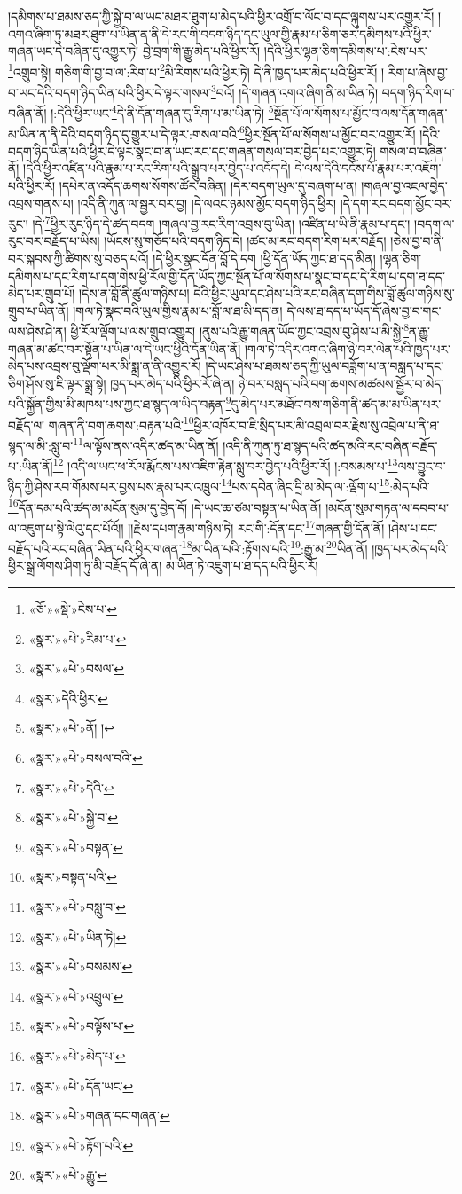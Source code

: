 །དམིགས་པ་ཐམས་ཅད་ཀྱི་སྐྱེ་བ་ལ་ཡང་མཐར་ཐུག་པ་མེད་པའི་ཕྱིར་འགྲོ་བ་ལོང་བ་དང་ལྐུགས་པར་འགྱུར་རོ། །འགའ་ཞིག་ཏུ་མཐར་ཐུག་པ་ཡིན་ན་ནི་དེ་རང་གི་བདག་ཉིད་དང་ཡུལ་གྱི་རྣམ་པ་ཅིག་ཅར་དམིགས་པའི་ཕྱིར་གཞན་ཡང་དེ་བཞིན་དུ་འགྱུར་ཏེ། བྱེ་བྲག་གི་རྒྱུ་མེད་པའི་ཕྱིར་རོ། །དེའི་ཕྱིར་ལྷན་ཅིག་དམིགས་པ་:ངེས་པར་\footnote{«ཅོ་»«སྡེ་»ངེས་པ་}འགྲུབ་སྟེ། གཅིག་གི་བྱ་བ་ལ་:རིག་པ་\footnote{«སྣར་»«པེ་»རིམ་པ་}མི་རིགས་པའི་ཕྱིར་ཏེ། དེ་ནི་ཁྱད་པར་མེད་པའི་ཕྱིར་རོ། །
རིག་པ་ཞེས་བྱ་བ་ཡང་དེའི་བདག་ཉིད་ཡིན་པའི་ཕྱིར་དེ་ལྟར་གསལ་\footnote{«སྣར་»«པེ་»བསལ་}བའོ། །དེ་གཞན་འགའ་ཞིག་ནི་མ་ཡིན་ཏེ། བདག་ཉིད་རིག་པ་བཞིན་ནོ། །:དེའི་ཕྱིར་ཡང་\footnote{«སྣར་»དེའི་ཕྱིར་}དེ་ནི་དོན་གཞན་དུ་རིག་པ་མ་ཡིན་ཏེ། \footnote{«སྣར་»«པེ་»ནོ། ། }སྔོན་པོ་ལ་སོགས་པ་མྱོང་བ་ལས་དོན་གཞན་མ་ཡིན་ན་ནི་དེའི་བདག་ཉིད་དུ་གྱུར་པ་དེ་ལྟར་:གསལ་བའི་\footnote{«སྣར་»«པེ་»བསལ་བའི་}ཕྱིར་སྔོན་པོ་ལ་སོགས་པ་མྱོང་བར་འགྱུར་རོ། །དེའི་བདག་ཉིད་ཡིན་པའི་ཕྱིར་དེ་ལྟར་སྣང་བ་ན་ཡང་རང་དང་གཞན་གསལ་བར་བྱེད་པར་འགྱུར་ཏེ། གསལ་བ་བཞིན་ནོ། །དེའི་ཕྱིར་འཛིན་པའི་རྣམ་པ་རང་རིག་པའི་སྒྲུབ་པར་བྱེད་པ་འདོད་དེ། དེ་ལས་དེའི་དངོས་པོ་རྣམ་པར་འཇོག་པའི་ཕྱིར་རོ། །དཔེར་ན་འདོད་ཆགས་སོགས་ཚོར་བཞིན། །དེར་བདག་ཡུལ་དུ་བཞག་པ་ན། །གཞལ་བྱ་འཇལ་བྱེད་འབྲས་གནས་པ། །འདི་ནི་ཀུན་ལ་སྦྱར་བར་བྱ། །དེ་ལའང་ཉམས་མྱོང་བདག་ཉིད་ཕྱིར། །དེ་དག་རང་བདག་མྱོང་བར་རུང་། །དེ་\footnote{«སྣར་»«པེ་»དེའི་}ཕྱིར་རུང་ཉིད་དེ་ཚད་བདག །གཞལ་བྱ་རང་རིག་འབྲས་བུ་ཡིན། །འཛིན་པ་ཡི་ནི་རྣམ་པ་དང་། །བདག་ལ་རུང་བར་བརྗོད་པ་ཡིས། །ཡོངས་སུ་གཅོད་པའི་བདག་ཉིད་དེ། །ཚང་མ་རང་བདག་རིག་པར་བརྗོད། །ཅེས་བྱ་བ་ནི་བར་སྐབས་ཀྱི་ཚིགས་སུ་བཅད་པའོ། །དེ་ཕྱིར་སྣང་དོན་བློ་དེ་དག །ཕྱི་དོན་ཡོད་ཀྱང་ཐ་དད་མིན། །ལྷན་ཅིག་དམིགས་པ་དང་རིག་པ་དག་གིས་ཕྱི་རོལ་གྱི་དོན་ཡོད་ཀྱང་སྔོན་པོ་ལ་སོགས་པ་སྣང་བ་དང་དེ་རིག་པ་དག་ཐ་དད་མེད་པར་གྲུབ་པོ། །དེས་ན་བློ་ནི་ཚུལ་གཉིས་པ། དེའི་ཕྱིར་ཡུལ་དང་ཤེས་པའི་རང་བཞིན་དག་གིས་བློ་ཚུལ་གཉིས་སུ་གྲུབ་པ་ཡིན་ནོ། །གལ་ཏེ་སྣང་བའི་ཡུལ་གྱིས་རྣམ་པ་བློ་ལ་ཐ་མི་དད་ན། དེ་ལས་ཐ་དད་པ་ཡོད་དོ་ཞེས་བྱ་བ་གང་ལས་ཤེས་ཤེ་ན། ཕྱི་རོལ་ལྡོག་པ་ལས་གྲུབ་འགྱུར། །ནུས་པའི་རྒྱུ་གཞན་ཡོད་ཀྱང་འབྲས་བུ་ཤེས་པ་མི་སྐྱེ་\footnote{«སྣར་»«པེ་»སྐྱེ་བ་}ན་རྒྱུ་གཞན་མ་ཚང་བར་སྟོན་པ་ཡིན་ལ་དེ་ཡང་ཕྱིའི་དོན་ཡིན་ནོ། །གལ་ཏེ་འདིར་འགའ་ཞིག་ཉེ་བར་ལེན་པའི་ཁྱད་པར་མེད་པས་འབྲས་བུ་ལྡོག་པར་མི་སྨྲ་ན་ནི་འགྱུར་རོ། །དེ་ཡང་ཤེས་པ་ཐམས་ཅད་ཀྱི་ཡུལ་བཟློག་པ་ན་བསླད་པ་དང་ཅིག་ཤོས་སུ་ཇི་ལྟར་སྨྲ་སྟེ། ཁྱད་པར་མེད་པའི་ཕྱིར་རོ་ཞེ་ན། ཉེ་བར་བསླད་པའི་བག་ཆགས་མཚམས་སྦྱོར་བ་མེད་པའི་སྐྱོན་གྱིས་མི་མཁས་པས་ཀྱང་ཐ་སྙད་ལ་ཡིད་བརྟན་\footnote{«སྣར་»«པེ་»བསྟན་}དུ་མེད་པར་མཐོང་བས་གཅིག་ནི་ཚད་མ་མ་ཡིན་པར་བརྗོད་ལ། གཞན་ནི་བག་ཆགས་:བརྟན་པའི་\footnote{«སྣར་»བསྟན་པའི་}ཕྱིར་འཁོར་བ་ཇི་སྲིད་པར་མི་འབྲལ་བར་རྗེས་སུ་འབྲེལ་པ་ནི་ཐ་སྙད་ལ་མི་:སླུ་བ་\footnote{«སྣར་»«པེ་»བསླུ་བ་}ལ་ལྟོས་ནས་འདིར་ཚད་མ་ཡིན་ནོ། །འདི་ནི་ཀུན་ཏུ་ཐ་སྙད་པའི་ཚད་མའི་རང་བཞིན་བརྗོད་པ་:ཡིན་ནོ།\footnote{«སྣར་»«པེ་»ཡིན་ཏེ།} །འདི་ལ་ཡང་ཕ་རོལ་རྨོངས་པས་འཇིག་རྟེན་སླུ་བར་བྱེད་པའི་ཕྱིར་རོ། །:བསམས་པ་\footnote{«སྣར་»«པེ་»བསམས་}ལས་བྱུང་བ་ཉིད་ཀྱི་ཤེས་རབ་གོམས་པར་བྱས་པས་རྣམ་པར་འཁྲུལ་\footnote{«སྣར་»«པེ་»འཕྲུལ་}པས་དབེན་ཞིང་དྲི་མ་མེད་ལ་:ལྡོག་པ་\footnote{«སྣར་»«པེ་»བལྟོས་པ་}:མེད་པའི་\footnote{«སྣར་»«པེ་»མེད་པ་}དོན་དམ་པའི་ཚད་མ་མངོན་སུམ་དུ་བྱེད་དོ། །དེ་ཡང་ཆ་ཙམ་བསྟན་པ་ཡིན་ནོ། །མངོན་སུམ་གཏན་ལ་དབབ་པ་ལ་འཇུག་པ་སྟེ་ལེའུ་དང་པོའོ།། །།རྗེས་དཔག་རྣམ་གཉིས་ཏེ། རང་གི་:དོན་དང་\footnote{«སྣར་»«པེ་»དོན་ཡང་}གཞན་གྱི་དོན་ནོ། །ཤེས་པ་དང་བརྗོད་པའི་རང་བཞིན་ཡིན་པའི་ཕྱིར་གཞན་\footnote{«སྣར་»«པེ་»གཞན་དང་གཞན་}མ་ཡིན་པའི་:རྟོགས་པའི་\footnote{«སྣར་»«པེ་»རྟོག་པའི་}:རྒྱུ་མ་\footnote{«སྣར་»«པེ་»རྒྱུ་}ཡིན་ནོ། །ཁྱད་པར་མེད་པའི་ཕྱིར་སྒྲ་ལོགས་ཤིག་ཏུ་མི་བརྗོད་དོ་ཞེ་ན། མ་ཡིན་ཏེ་འཇུག་པ་ཐ་དད་པའི་ཕྱིར་རོ། 